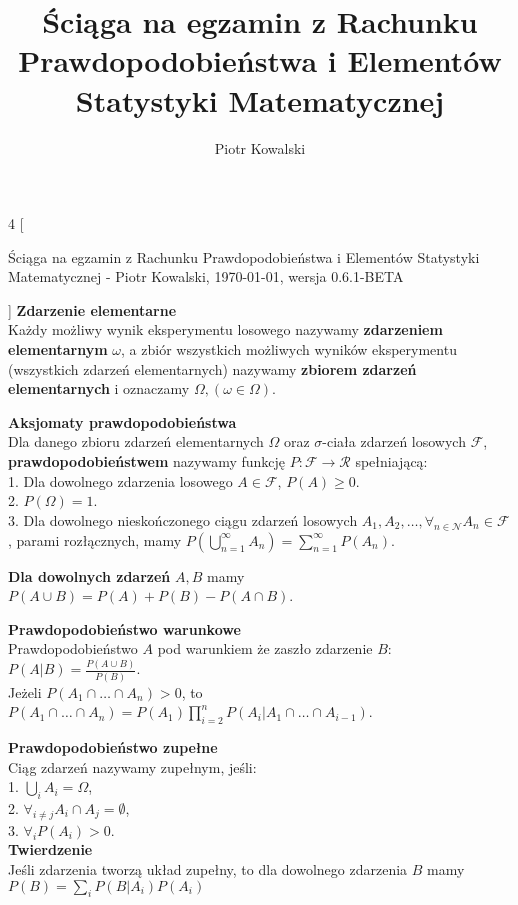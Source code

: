 \documentclass[10pt,landscape,a4paper,notitlepage]{article}
\author{Piotr Kowalski}
\title{Ściąga na egzamin z Rachunku Prawdopodobieństwa i Elementów Statystyki Matematycznej}
\begin{document}
    \begin{multicols*}{4}
        [
        \begin{center}
            Ściąga na egzamin z Rachunku Prawdopodobieństwa i Elementów Statystyki Matematycznej - Piotr Kowalski, \today , wersja 0.6.1-BETA
        \end{center}
        ]
        \noindent\textbf{\large Zdarzenie elementarne}\\
        Każdy możliwy wynik eksperymentu losowego nazywamy \textbf{zdarzeniem elementarnym} $\omega$, a zbiór wszystkich możliwych wyników eksperymentu (wszystkich zdarzeń elementarnych) nazywamy \textbf{zbiorem zdarzeń elementarnych} i oznaczamy $\Omega, (\omega\in\Omega)$.
        
        \noindent\textbf{\large Aksjomaty prawdopodobieństwa}\\
        Dla danego zbioru zdarzeń elementarnych $\Omega$ oraz $\sigma$-ciała zdarzeń losowych $\mathcal{F}$, \textbf{prawdopodobieństwem} nazywamy funkcję $P:\mathcal{F}\rightarrow \mathcal{R}$ spełniającą:\\
        1. Dla dowolnego zdarzenia losowego $A\in\mathcal{F}$, $P(A)\geq 0$.\\
        2. $P(\Omega)=1$.\\
        3. Dla dowolnego nieskończonego ciągu zdarzeń losowych $A_1, A_2, \ldots, \forall_{n\in\mathcal{N}} A_n\in\mathcal{F}$, parami rozłącznych, mamy $P\left(\bigcup^\infty_{n=1}A_n\right)=\sum^\infty_{n=1}P(A_n)$.

        \noindent \textbf{Dla dowolnych zdarzeń} $A, B$ mamy\\ $P(A\cup B)=P(A)+P(B)-P(A\cap B)$.

        \noindent \textbf{\large Prawdopodobieństwo warunkowe}\\
        Prawdopodobieństwo $A$ pod warunkiem że zaszło zdarzenie $B$: $P(A|B)=\frac{P(A\cup B)}{P(B)}$.\\
        Jeżeli $P(A_1\cap \ldots \cap A_n)>0$, to $P(A_1\cap \ldots \cap A_n) = P(A_1)\prod_{i=2}^nP(A_i|A_1 \cap\ldots\cap A_{i-1})$.

        \noindent \textbf{\large Prawdopodobieństwo zupełne}\\
        Ciąg zdarzeń nazywamy zupełnym, jeśli:\\
        1. $\bigcup_i A_i = \Omega$,\\
        2. $\forall_{i\neq j}A_i \cap A_j = \emptyset$,\\
        3. $\forall_i P(A_i)>0$.\\
        \textbf{Twierdzenie}\\
        Jeśli zdarzenia tworzą układ zupełny, to dla dowolnego zdarzenia $B$ mamy $P(B)=\sum_iP(B|A_i)P(A_i)$


\end{multicols*}
\end{document}
